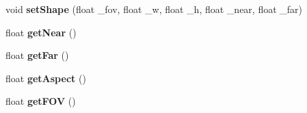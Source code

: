 \begin{DoxyCompactItemize}
\item 
\hypertarget{class_camera_a32339cc790fad36dcbb70e37d60093a1}{void {\bfseries set\-Shape} (float \-\_\-fov, float \-\_\-w, float \-\_\-h, float \-\_\-near, float \-\_\-far)}\label{class_camera_a32339cc790fad36dcbb70e37d60093a1}

\item 
\hypertarget{class_camera_a0bc11a4bdfcd2100b73d3e24dabd60f2}{float {\bfseries get\-Near} ()}\label{class_camera_a0bc11a4bdfcd2100b73d3e24dabd60f2}

\item 
\hypertarget{class_camera_abb6b10d520e938318c5ac384a2782eae}{float {\bfseries get\-Far} ()}\label{class_camera_abb6b10d520e938318c5ac384a2782eae}

\item 
\hypertarget{class_camera_a05b97210660223d275312181c2eab718}{float {\bfseries get\-Aspect} ()}\label{class_camera_a05b97210660223d275312181c2eab718}

\item 
\hypertarget{class_camera_a5ec1871e6f296d8528e64157c6371c09}{float {\bfseries get\-F\-O\-V} ()}\label{class_camera_a5ec1871e6f296d8528e64157c6371c09}

\end{DoxyCompactItemize}
